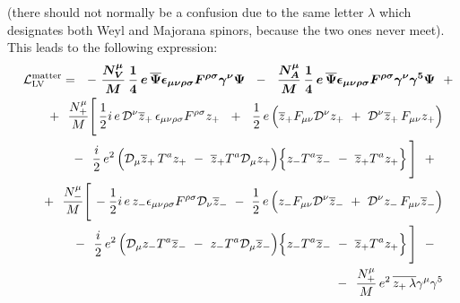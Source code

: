 \documentclass[12pt]{revtex4}
\newcommand{\slashed}[1]{\hbox{{$#1$}\llap{$/$}}}
\begin{document}
(there should not normally be a confusion due to the
same letter $ \lambda $ which designates both Weyl
and Majorana spinors, because the two ones never meet).
This leads to the following expression:
\begin{eqnarray}
\nonumber
\lefteqn{
     \mathcal{L}_{\mathrm{LV}}^{\mathrm{matter}}  = 
~~      %
-~
\boldsymbol{
\frac{N_V^\mu}{M}\,
\frac{1}{4} \,e\,
\overline{\Psi} \epsilon_{\mu\nu\rho\sigma}
F^{\rho\sigma} \gamma^\nu \Psi 
     }
~~-~~
\boldsymbol{
\frac{N_A^\mu}{M}\,
\frac{1}{4} \,e\,
\overline{\Psi} \epsilon_{\mu\nu\rho\sigma}
F^{\rho\sigma} \gamma^\nu \gamma^5 \Psi 
     }
~~+~~ 
}\\
\nonumber
&&
~~+~~
\frac{N_+^\mu}{M}
\Bigg[\,
\frac{1}{2}i \,e \, 
\mathcal{D}^\nu \overline{z}_+ \,
\epsilon_{\mu\nu\rho\sigma}F^{\rho\sigma} z_+ 
~~+~~
\frac{1}{2}\, e\,
\Big(
  \overline{z}_+ F_{\mu\nu}
  \mathcal{D}^\nu z_+ 
  ~+~
  \mathcal{D}^\nu \overline{z}_+ \,
  F_{\mu\nu} z_+
\Big) 
\\
\nonumber
&&
               \qquad
~~-~~
\frac{i}{2}\, e^2\,
\Big(
  \mathcal{D}_\mu \overline{z}_+ \,
  T^a z_+ 
  ~-~
  \overline{z}_+ T^a \mathcal{D}_\mu z_+
\Big)
\Big\{
  z_- T^a \overline{z}_- 
  ~-~
  \overline{z}_+ T^a z_+
\Big\}
\,\Bigg] ~~+~~ \\
\nonumber
&&
~~+~~
\frac{N_-^\mu}{M}
\Bigg[\,
- \frac{1}{2} i\, e\,
z_- \epsilon_{\mu\nu\rho\sigma}F^{\rho\sigma}
\mathcal{D}_\nu \overline{z}_- 
~-~
\frac{1}{2}\, e\,
\Big(
  z_- F_{\mu\nu}\mathcal{D}^\nu \overline{z}_- 
  ~+~
  \mathcal{D}^\nu z_- \,
  F_{\mu\nu} \overline{z}_- 
\Big)
\\
\nonumber
&&
               \qquad
~~-~~ 
\frac{i}{2}\, e^2\,
\Big(
  \mathcal{D}_\mu z_- T^a \overline{z}_-
  ~-~
  z_- T^a \mathcal{D}_\mu \overline{z}_-
\Big)
\Big\{
  z_- T^a \overline{z}_- 
  ~-~
  \overline{z}_+ T^a z_+
\Big\}
\,\Bigg]
~~-~~ \\
\nonumber
&&
~~-~~
\frac{N_+^\mu}{M}\, e^2\,
\overline{z_+ \, \lambda} \gamma^\mu \gamma^5 

\end{eqnarray}
\end{document}
